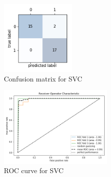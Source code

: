 \documentclass[acmtog]{acmart}
\begin{document}
\begin{figure}[h]
  \includegraphics[width=0.33\textwidth]{confusion_matrix}
  \caption{Confusion matrix for SVC}
  \label{fig:confusion_matrix}
\end{figure}

\begin{figure}[h]
  \includegraphics[width=0.5\textwidth]{ROC_curve}
  \caption{ROC curve for SVC}
  \label{fig:ROC_curve}
\end{figure}
\end{document}
